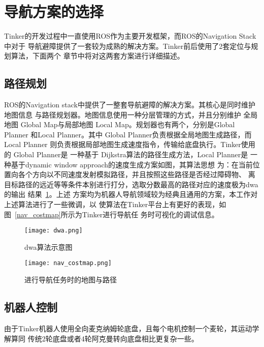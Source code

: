 \section{导航方案的选择}

Tinker的开发过程中一直使用ROS作为主要开发框架，而ROS的Navigation Stack中对于
导航避障提供了一套较为成熟的解决方案。Tinker前后使用了2套定位与规划算法，下面两个
章节中将对这两套方案进行详细描述。

\subsection{路径规划}

ROS的Navigation stack中提供了一整套导航避障的解决方案。其核心是同时维护地图信息
与路径规划器。地图信息使用一种分层管理的方式\cite{lu2014layered}，并且分别维护
全局地图 Global Map与局部地图 Local Map。规划器也有两个，分别是Global Planner
和Local Planner。其中 Global Planner负责根据全局地图生成路径，而 Local Planner
则负责根据局部地图生成速度指令，传输给底盘执行。Tinker使用的 Global Planner是
一种基于 Dijkstra算法\cite{deng2012fuzzy}的路径生成方法，Local Planner是
一种基于dynamic window approach的速度生成方案\cite{fox1997dynamic}如图，其算法思想
为：在当前位置向各个方向以不同速度发射模拟路径，并且按照这些路径是否经过障碍物、
离目标路径的远近等等条件本别进行打分，选取分数最高的路径对应的速度极为dwa的输出
结果~\ref{fig:dwa}。上述
方案均为机器人导航领域较为经典且通用的方案，本工作对上述算法进行了一些微调，以
使算法在Tinker平台上有更好的表现，如图~\ref{nav_costmap}所示为Tinker进行导航任
务时可视化的调试信息。


\begin{figure}[h] %
  \centering
  \texttt{[image: dwa.png]}
  \caption{dwa算法示意图}
  \label{fig:dwa}
\end{figure}


\begin{figure}[h] %
  \centering
  \texttt{[image: nav\_costmap.png]}
  \caption{进行导航任务时的地图与路径}
  \label{fig:nav_costmap}
\end{figure}

\subsection{机器人控制}

由于Tinker机器人使用全向麦克纳姆轮底盘，且每个电机控制一个麦轮，其运动学解算同
传统2轮底盘或者4轮阿克曼转向底盘相比更复杂一些。


